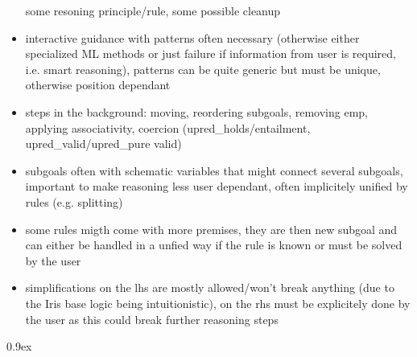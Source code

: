 \documentclass[11pt,a4paper]{article}
\begin{document}
\begin{itemize}
  some resoning principle/rule, some possible cleanup
\item interactive guidance with patterns often necessary (otherwise either specialized ML methods or
  just failure if information from user is required, i.e. smart reasoning), patterns can be quite 
  generic but must be unique, otherwise position dependant
\item steps in the background: moving, reordering subgoals, removing emp, applying associativity,
  coercion (upred_holds/entailment, upred_valid/upred_pure valid)
\item subgoals often with schematic variables that might connect several subgoals, important to make
  reasoning less user dependant, often implicitely unified by rules (e.g. splitting)
\item some rules migth come with more premises, they are then new subgoal and can either be handled 
  in a unfied way if the rule is known or must be solved by the user
\item simplifications on the lhs are mostly allowed/won't break anything (due to the Iris base logic
  being intuitionistic), on the rhs must be explicitely done by the user as this could break further
  reasoning steps
\end{itemize}

\parindent 0pt
\parskip 0.9ex





\end{document}
